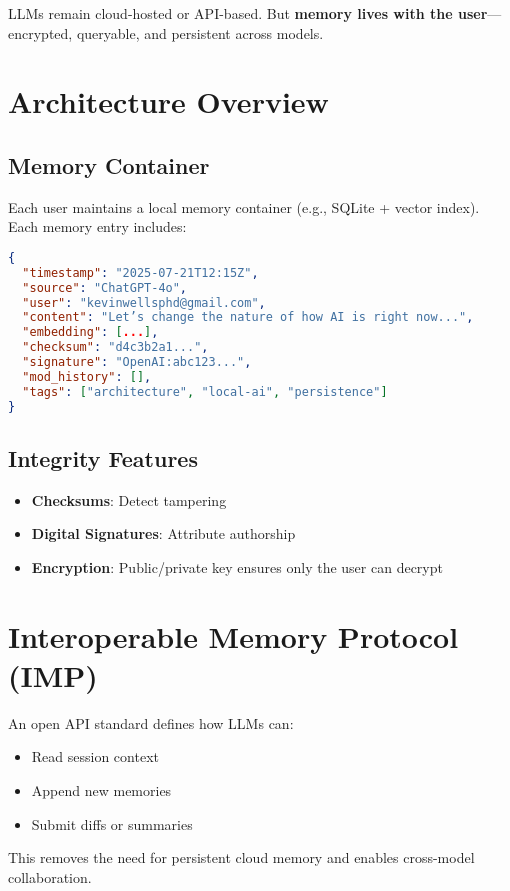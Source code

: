 \documentclass[11pt]{article}
\begin{document}
LLMs remain cloud-hosted or API-based. But \textbf{memory lives with the user}—encrypted, queryable, and persistent across models.

\section{Architecture Overview}

\subsection{Memory Container}
Each user maintains a local memory container (e.g., SQLite + vector index). Each memory entry includes:

\begin{lstlisting}[basicstyle=\ttfamily\small, frame=single, caption=Sample Memory Entry, language=json]
{
  "timestamp": "2025-07-21T12:15Z",
  "source": "ChatGPT-4o",
  "user": "kevinwellsphd@gmail.com",
  "content": "Let’s change the nature of how AI is right now...",
  "embedding": [...],
  "checksum": "d4c3b2a1...",
  "signature": "OpenAI:abc123...",
  "mod_history": [],
  "tags": ["architecture", "local-ai", "persistence"]
}
\end{lstlisting}

\subsection{Integrity Features}
\begin{itemize}[nosep]
    \item \textbf{Checksums}: Detect tampering
    \item \textbf{Digital Signatures}: Attribute authorship
    \item \textbf{Encryption}: Public/private key ensures only the user can decrypt
\end{itemize}

\section{Interoperable Memory Protocol (IMP)}
An open API standard defines how LLMs can:
\begin{itemize}[nosep]
    \item Read session context
    \item Append new memories
    \item Submit diffs or summaries
\end{itemize}

This removes the need for persistent cloud memory and enables cross-model collaboration.
\end{document}
